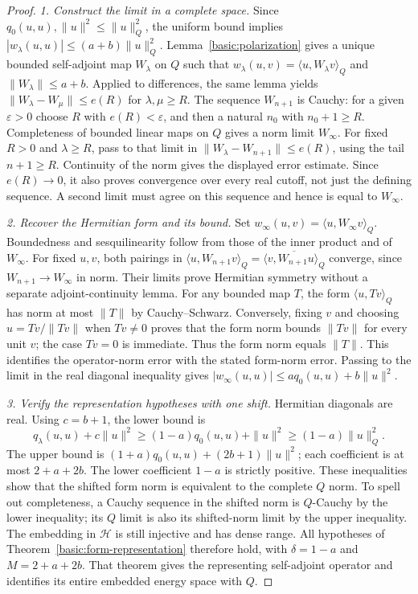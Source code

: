 \documentclass[11pt,a4paper]{article}
\theoremstyle{definition}
\theoremstyle{remark}
\begin{document}
\begin{proof}
\emph{1. Construct the limit in a complete space.}
Since $q_0(u,u),\|u\|^2\leq\|u\|_Q^2$, the uniform
bound implies $|w_\lambda(u,u)|\leq(a+b)\|u\|_Q^2$.
Lemma~\ref{basic:polarization} gives a unique bounded self-adjoint
map $W_\lambda$ on $Q$ such that
$w_\lambda(u,v)=\langle u,W_\lambda v\rangle_Q$ and
$\|W_\lambda\|\leq a+b$. Applied to differences, the same
lemma yields
$\|W_\lambda-W_\mu\|\leq e(R)$ for $\lambda,\mu\geq R$.
The sequence $W_{n+1}$ is Cauchy: for a given $\varepsilon>0$
choose $R$ with $e(R)<\varepsilon$, and then a natural $n_0$
with $n_0+1\geq R$. Completeness of bounded linear maps on $Q$
gives a norm limit $W_\infty$.
For fixed $R>0$ and $\lambda\geq R$, pass to that limit in
$\|W_\lambda-W_{n+1}\|\leq e(R)$, using the tail $n+1\geq R$.
Continuity of the norm gives the displayed error estimate. Since
$e(R)\to0$, it also proves convergence over every real cutoff,
not just the defining sequence. A second limit must agree on this
sequence and hence is equal to $W_\infty$.

\emph{2. Recover the Hermitian form and its bound.}
Set $w_\infty(u,v)=\langle u,W_\infty v\rangle_Q$.
Boundedness and sesquilinearity follow from those of the inner
product and of $W_\infty$. For fixed $u,v$, both pairings in
$\langle u,W_{n+1}v\rangle_Q
 =\overline{\langle v,W_{n+1}u\rangle_Q}$ converge, since
$W_{n+1}\to W_\infty$ in norm. Their limits prove Hermitian
symmetry without a separate adjoint-continuity lemma.
For any bounded map $T$, the form $\langle u,Tv\rangle_Q$
has norm at most $\|T\|$ by Cauchy--Schwarz. Conversely, fixing
$v$ and choosing $u=Tv/\|Tv\|$ when $Tv\ne0$ proves that
the form norm bounds $\|Tv\|$ for every unit $v$; the case
$Tv=0$ is immediate. Thus the form norm equals $\|T\|$.
This identifies the operator-norm error with the stated form-norm
error. Passing to the limit in the real diagonal inequality gives
$|w_\infty(u,u)|\leq a q_0(u,u)+b\|u\|^2$.

\emph{3. Verify the representation hypotheses with one shift.}
Hermitian diagonals are real. Using $c=b+1$, the lower bound is
\[
 q_\lambda(u,u)+c\|u\|^2
 \geq(1-a)q_0(u,u)+\|u\|^2
 \geq(1-a)\|u\|_Q^2.
\]
The upper bound is
$(1+a)q_0(u,u)+(2b+1)\|u\|^2$; each coefficient is at most
$2+a+2b$. The lower coefficient $1-a$ is strictly positive.
These inequalities show that the shifted form norm is equivalent
to the complete $Q$ norm. To spell out completeness, a Cauchy
sequence in the shifted norm is $Q$-Cauchy by the lower inequality;
its $Q$ limit is also its shifted-norm limit by the upper inequality.
The embedding in $\mathcal H$ is still injective and has dense
range. All hypotheses of Theorem~\ref{basic:form-representation}
therefore hold, with $\delta=1-a$ and $M=2+a+2b$. That theorem
gives the representing self-adjoint operator and identifies its
entire embedded energy space with $Q$.
\end{proof}
\end{document}
